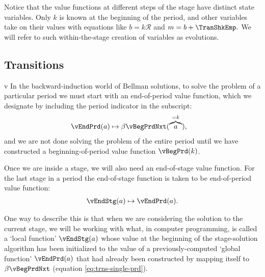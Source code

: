 \documentclass[titlepage, headings=optiontotocandhead]{Resources/texmf-local/tex/latex/econtex}
\begin{document}
  Notice that the value functions at different {step}s of the {stage} have distinct state variables.  Only $k$ is known at the beginning of the period, and other variables take on their values with equations like $b = k \mathcal{R}$ and $m = b+\TranShkEmp.$  We will refer to such within-the-{stage} creation of variables as {evolutions}.%

\subsection{Transitions}
v
  In the backward-induction world of Bellman solutions, to solve the problem of a particular {period} we must start with an end-of-{period} value function, which we designate by including the {period} indicator in the subscript:
  \begin{equation}\begin{gathered}\begin{aligned}
        \vEndPrd(a) & \mapsto \beta \vBegPrdNxt(\overbrace{a}^{=k}), \label{eq:trns-single-prd}
  \end{aligned}\end{gathered}\end{equation}
and we are not done solving the problem of the entire {period} until we have constructed a beginning-of-{period} value function $\vBegPrd(k)$.

Once we are inside a {stage}, we will also need an end-of-{stage} value function.  For the last {stage} in a {period} the end-of-{stage} function is taken to be end-of-{period} value function:
  \begin{equation}\begin{gathered}\begin{aligned}
        \vEndStg(a) \mapsto \vEndPrd(a).
      \end{aligned}\end{gathered}\end{equation}

One way to describe this is that when we are considering the solution to the current {stage}, we will be working with what, in computer programming, is called a `local function' $\vEndStg(a)$ whose value at the beginning of the {stage}-solution algorithm has been initialized to the value of a previously-computed `global function' $\vEndPrd(a)$ that had already been constructed by mapping itself to $\beta \vBegPrdNxt$ (equation \eqref{eq:trns-single-prd}).
\hypertarget{decision-problem}{}
\end{document}
